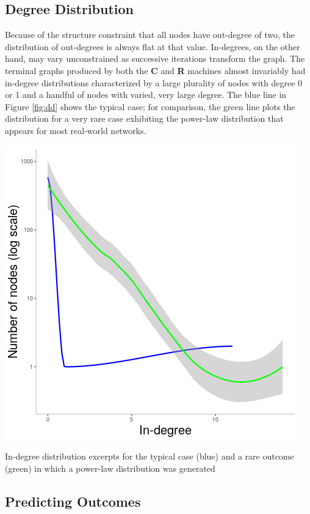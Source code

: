 \documentclass{tufte-handout}
\begin{document}
\subsection{Degree Distribution}

Because of the structure constraint that all nodes have out-degree of two, the distribution
of out-degrees is always flat at that value. In-degrees, on the other hand, may vary unconstrained as successive
iterations transform the graph. The terminal graphs produced by both the \textbf{C} and
\textbf{R} machines almost invariably had in-degree distributions characterized by a large
plurality of nodes with degree 0 or 1 and a handful of nodes with varied, very large degree.
The blue line in Figure \ref{fig:dd} shows the typical case; for comparison, the green line
plots the distribution for a very rare case exhibiting the power-law distribution that appears
for most real-world networks.

\begin{marginfigure}
  \includegraphics{dd.png}
  \caption{In-degree distribution excerpts for the typical case (blue) and a
        rare outcome (green) in which a power-law distribution was generated}
  \label{fig:dd}
\end{marginfigure}

\subsection{Predicting Outcomes}
\end{document}
